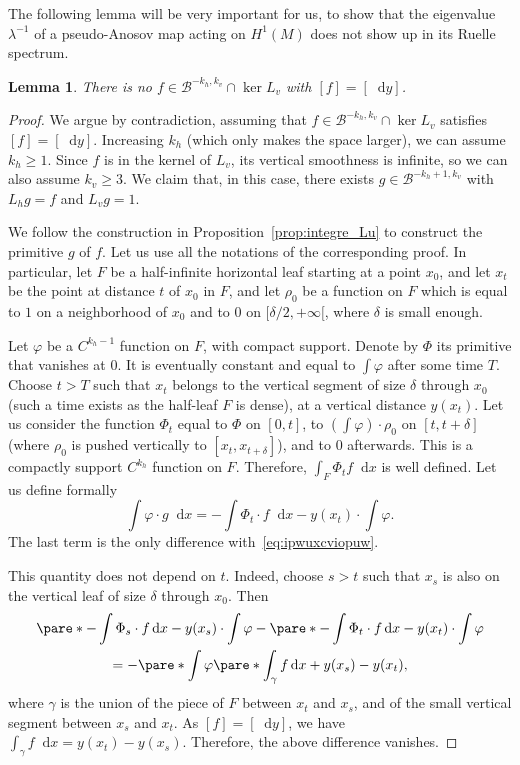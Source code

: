 \documentclass[11pt, a4paper, oneside, final, pagebackref]{amsart}
\newcommand{\boB}{\mathcal{B}}
\newcommand{\dd}{\mathop{}\!\mathrm{d}}
\renewcommand{\phi}{\varphi}
\renewcommand{\geq}{\geqslant}
\newtheorem{lem}[thm]{Lemma}
\theoremstyle{definition}
\numberwithin{equation}{section}
\begin{document}
The following lemma will be very important for us, to show that the
eigenvalue $\lambda^{-1}$ of a pseudo-Anosov map acting on $H^1(M)$ does not
show up in its Ruelle spectrum.

\begin{lem}
\label{lem:Lv_preimage_1} There is no $f \in \boB^{-k_h, k_v} \cap \ker L_v$
with $[f] = [\dd y]$.
\end{lem}
\begin{proof}
We argue by contradiction, assuming that $f \in \boB^{-k_h, k_v} \cap \ker
L_v$ satisfies $[f] = [\dd y]$. Increasing $k_h$ (which only makes the space
larger), we can assume $k_h \geq 1$. Since $f$ is in the kernel of $L_v$, its
vertical smoothness is infinite, so we can also assume $k_v\geq 3$. We claim
that, in this case, there exists $g \in \boB^{-k_h+1, k_v}$ with $L_h g = f$
and $L_v g = 1$.

We follow the construction in Proposition~\ref{prop:integre_Lu} to construct
the primitive $g$ of $f$. Let us use all the notations of the corresponding
proof. In particular, let $F$ be a half-infinite horizontal leaf starting at
a point $x_0$, and let $x_t$ be the point at distance $t$ of $x_0$ in $F$,
and let $\rho_0$ be a function on $F$ which is equal to $1$ on a neighborhood
of $x_0$ and to $0$ on $[\delta/2, +\infty[$, where $\delta$ is small enough.

Let $\phi$ be a $C^{k_h-1}$ function on $F$, with compact support. Denote by
$\Phi$ its primitive that vanishes at $0$. It is eventually constant and
equal to $\int \phi$ after some time $T$. Choose $t>T$ such that $x_t$
belongs to the vertical segment of size $\delta$ through $x_0$ (such a time
exists as the half-leaf $F$ is dense), at a vertical distance $y(x_t)$. Let
us consider the function $\Phi_t$ equal to $\Phi$ on $[0,t]$, to $(\int \phi)
\cdot \rho_0$ on $[t, t+\delta]$ (where $\rho_0$ is pushed vertically to
$[x_t, x_{t+\delta}]$), and to $0$ afterwards. This is a compactly support
$C^{k_h}$ function on $F$. Therefore, $\int_F \Phi_t f \dd x$ is well
defined. Let us define formally
\begin{equation}
\label{eq:puiowxuiopv}
  \int \phi\cdot g \dd x = -\int \Phi_t \cdot f \dd x - y(x_t) \cdot \int \phi.
\end{equation}
The last term is the only difference with~\eqref{eq:ipwuxcviopuw}.

This quantity does not depend on $t$. Indeed, choose $s>t$ such that $x_s$ is
also on the vertical leaf of size $\delta$ through $x_0$. Then
\begin{multline*}
  \pare*{-\int \Phi_s \cdot f \dd x - y(x_s) \cdot \int \phi} - \pare*{-\int \Phi_t \cdot f \dd x - y(x_t) \cdot \int \phi}
  \\ = -\pare*{\int \phi} \pare*{\int_\gamma f \dd x + y(x_s) - y(x_t)},
\end{multline*}
where $\gamma$ is the union of the piece of $F$ between $x_t$ and $x_s$, and
of the small vertical segment between $x_s$ and $x_t$. As $[f] = [\dd y]$, we
have $\int_\gamma f \dd x = y(x_t) - y(x_s)$. Therefore, the above difference
vanishes.


\end{proof}
\end{document}
